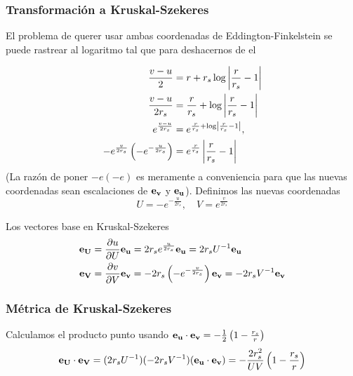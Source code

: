 \subsubsection{Transformación a Kruskal-Szekeres}
El problema de querer usar ambas coordenadas de Eddington-Finkelstein se puede rastrear al logaritmo tal que para deshacernos de el 

\begin{equation}
    \begin{aligned}
        \frac{v-u}{2}&=r+r_s \log \left|\frac{r}{r_s}-1\right|                 \\
        \frac{v-u}{2 r_s}&=\frac{r}{r_s}+\log \left|\frac{r}{r_s}-1\right|     \\
        e^{\frac{v-u}{2 r_s}}&=e^{\frac{r}{r_s}+\log \left|  \frac{r}{r_s} - 1 \right| }, \\
        -e^{\frac{v}{2 r_s}}\left(-e^{-\frac{u}{2 r_s}}\right)&=e^{\frac{r}{r_s}}\left|\frac{r}{r_s}-1\right|
    \end{aligned}
\end{equation}
(La razón de poner $-e(-e)$ es meramente a conveniencia para que las nuevas coordenadas sean escalaciones de $\mathbf{e_v}$ y $\mathbf{e_u}$).
Definimos las nuevas coordenadas
\begin{equation}
    U = -e^{-\frac{u}{2r_s}}, \quad V = e^{\frac{v}{2 r_s}}
\end{equation}

Los vectores base en Kruskal-Szekeres 
\begin{equation}
    \begin{aligned}
        \mathbf{e_U} & = \frac{\partial u}{\partial U} \mathbf{e_u} = 2r_s e^{\frac{u}{2r_s}} \mathbf{e_u}  = 2r_s U^{-1} \mathbf{e_u} \\
        \mathbf{e_V} & = \frac{\partial v}{\partial V} \mathbf{e_v} = -  2r_s \left(- e^{-\frac{v}{2r_s}}\right) \mathbf{e_v} =- 2r_s V^{-1} \mathbf{e_v}
    \end{aligned}
\end{equation}

\subsubsection{Métrica de Kruskal-Szekeres}
Calculamos el producto punto usando \( \mathbf{e_u} \cdot \mathbf{e_v} = -\frac{1}{2}\left(1-\frac{r_s}{r}\right) \)
\begin{equation}
    \mathbf{e_U} \cdot \mathbf{e_V} = (2r_s U^{-1})(-2r_s V^{-1})(\mathbf{e_u} \cdot \mathbf{e_v}) = - \frac{2r_s^2}{U V}\left(1-\frac{r_s}{r}\right)
\end{equation}


